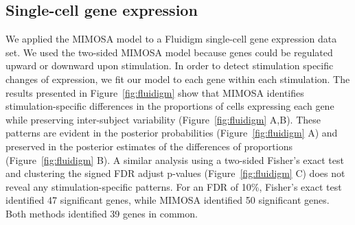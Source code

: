 \documentclass[12pt,oupdraft]{biostatistics}
\begin{document}
\subsection{Single-cell gene expression}
We applied the MIMOSA model to a Fluidigm single-cell gene expression data set. We used the two-sided MIMOSA model because genes could be regulated upward or downward upon stimulation. In order to detect stimulation specific changes of expression, we fit our model to each gene within each stimulation. The results presented in Figure~\ref{fig:fluidigm} show that MIMOSA identifies stimulation-specific differences in the proportions of cells expressing each gene while preserving inter-subject variability (Figure~\ref{fig:fluidigm} A,B). These patterns are evident in the  posterior probabilities (Figure~\ref{fig:fluidigm} A) and preserved in the posterior estimates of the differences of proportions (Figure~\ref{fig:fluidigm} B). A similar analysis using a two-sided Fisher's exact test and clustering the signed FDR adjust p-values (Figure~\ref{fig:fluidigm} C) does not reveal any stimulation-specific patterns. For an FDR of 10\%, Fisher's exact test identified 47 significant genes, while MIMOSA identified 50 significant genes. Both methods identified 39 genes in common.
\end{document}
